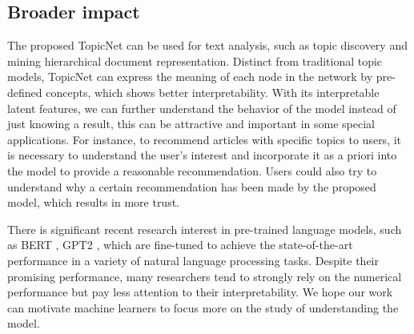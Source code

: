 \documentclass{article}
\begin{document}

\subsection{Broader impact}
The proposed TopicNet can be used for text analysis, such as topic discovery and mining hierarchical document representation. Distinct from traditional topic models, TopicNet can express the meaning of each node in the network by pre-defined concepts, which shows better interpretability. With its interpretable latent features, we can further understand the behavior of the model instead of just knowing a result, this can be attractive and important in some special applications. For instance, to recommend articles with specific topics to users, it is necessary to understand the user's interest and incorporate it as a priori into the model to provide a reasonable recommendation. Users could also try to understand why a certain recommendation has been made by the proposed model, which results in more trust. 


There is significant recent research interest in pre-trained language models, such as BERT \cite{devlin2018bert}, GPT2 \cite{radford2019language}, which are fine-tuned to achieve the state-of-the-art performance in a variety of natural language processing tasks. Despite their promising performance, 
many researchers tend to strongly rely on the numerical performance but pay less attention to their interpretability. We hope our work can motivate machine learners to focus more on the study of understanding the model.

\end{document}
